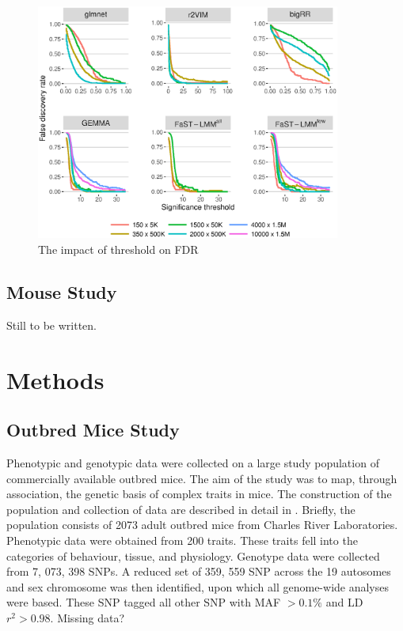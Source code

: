 \documentclass{nature}
\begin{document}
\begin{figure}
\label{fig_threshold}
\caption{The impact of threshold on FDR }
\includegraphics[width=10cm]{threshold}
\end{figure}




\subsection{Mouse Study}
Still to be written. 


\section{Methods}

\subsection{Outbred Mice Study}

Phenotypic and genotypic data were collected on a large study population of commercially 
available outbred mice. The aim of the study was to map, through association, the genetic basis
of complex traits in mice. The construction of the population and collection of data are described in detail in 
\cite{nicod2016genome}.  Briefly, the population consists of 2073 adult outbred mice from Charles River Laboratories. Phenotypic data
were obtained from 200 traits. These traits fell into the categories of behaviour, tissue, and physiology. Genotype 
data were collected from 7, 073, 398 SNPs.  A reduced set of 359, 559 SNP across the 19 
autosomes and sex chromosome was then identified, upon which all genome-wide analyses were based.  These SNP tagged all other SNP with MAF $> 0.1\%$
and LD $r^2 > 0.98$.  Missing data?
\end{document}
